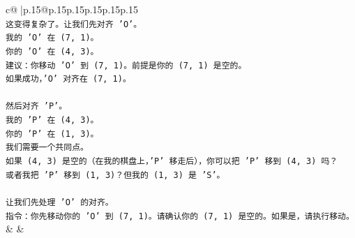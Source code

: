 \documentclass{article}
\begin{document}
{\begin{supertabular}{c@{$\;$}|p{.15\linewidth}@{}p{.15\linewidth}p{.15\linewidth}p{.15\linewidth}p{.15\linewidth}p{.15\linewidth}}
{{{\\ 
\texttt{这变得复杂了。让我们先对齐 'O'。} \\
\texttt{我的 'O' 在 (7, 1)。} \\
\texttt{你的 'O' 在 (4, 3)。} \\
\texttt{建议：你移动 'O' 到 (7, 1)。前提是你的 (7, 1) 是空的。} \\
\texttt{如果成功，'O' 对齐在 (7, 1)。} \\
\\ 
\texttt{然后对齐 'P'。} \\
\texttt{我的 'P' 在 (4, 3)。} \\
\texttt{你的 'P' 在 (1, 3)。} \\
\texttt{我们需要一个共同点。} \\
\texttt{如果 (4, 3) 是空的（在我的棋盘上，'P' 移走后），你可以把 'P' 移到 (4, 3) 吗？} \\
\texttt{或者我把 'P' 移到 (1, 3)？但我的 (1, 3) 是 'S'。} \\
\\ 
\texttt{让我们先处理 'O' 的对齐。} \\
\texttt{指令：你先移动你的 'O' 到 (7, 1)。请确认你的 (7, 1) 是空的。如果是，请执行移动。} \\
            }
        }
    }
    & & \\ \\


\end{supertabular}}
\end{document}
